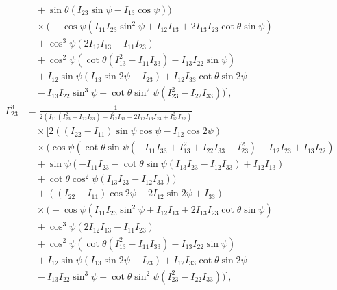 \documentclass[pdflatex,sn-mathphys-num]{sn-jnl}%
\theoremstyle{thmstyleone}%
\theoremstyle{thmstyletwo}%
\theoremstyle{thmstylethree}%
\begin{document}
\begin{appendices}
\begin{align}
    &\quad +\sin \theta (I_{23} \sin \psi-I_{13} \cos \psi)) \nonumber \\
    &\quad \times \bigg(-\cos \psi \left(I_{11} I_{23} \sin ^2\psi+I_{12} I_{13}+2 I_{13} I_{23} \cot \theta \sin \psi\right) \nonumber \\
    &\quad +\cos ^3\psi (2 I_{12} I_{13}-I_{11} I_{23}) \nonumber \\
    &\quad +\cos ^2\psi \left(\cot \theta \left(I_{13}^2-I_{11} I_{33}\right)-I_{13} I_{22} \sin \psi\right) \nonumber \\
    &\quad +I_{12} \sin \psi (I_{13} \sin 2\psi+I_{23}) +I_{12} I_{33} \cot \theta \sin 2\psi \nonumber \\
    &\quad -I_{13} I_{22} \sin ^3\psi+\cot \theta \sin ^2\psi \left(I_{23}^2-I_{22} I_{33}\right)\bigg) \bigg], \nonumber \\
    \Gamma^{3}_{23} &= \frac{1}{2 \left(I_{11} \left(I_{23}^2-I_{22} I_{33}\right)+I_{12}^2 I_{33}-2 I_{12} I_{13} I_{23}+I_{13}^2 I_{22}\right)} \nonumber \\
    &\quad \times \bigg[ 2 ((I_{22}-I_{11}) \sin \psi \cos \psi-I_{12} \cos 2\psi) \nonumber \\
    &\quad \times \bigg(\cos \psi \left(\cot \theta \sin \psi \left(-I_{11} I_{33}+I_{13}^2+I_{22} I_{33}-I_{23}^2\right)-I_{12} I_{23}+I_{13} I_{22}\right) \nonumber \\
    &\quad +\sin \psi (-I_{11} I_{23}-\cot \theta \sin \psi (I_{13} I_{23}-I_{12} I_{33})+I_{12} I_{13}) \nonumber \\
    &\quad +\cot \theta \cos ^2\psi (I_{13} I_{23}-I_{12} I_{33})\bigg) \nonumber \\
    &\quad +((I_{22}-I_{11}) \cos 2\psi+2 I_{12} \sin 2\psi+I_{33}) \nonumber \\
    &\quad \times \bigg(-\cos \psi \left(I_{11} I_{23} \sin ^2\psi+I_{12} I_{13}+2 I_{13} I_{23} \cot \theta \sin \psi\right) \nonumber \\
    &\quad +\cos ^3\psi (2 I_{12} I_{13}-I_{11} I_{23}) \nonumber \\
    &\quad +\cos ^2\psi \left(\cot \theta \left(I_{13}^2-I_{11} I_{33}\right)-I_{13} I_{22} \sin \psi\right) \nonumber \\
    &\quad +I_{12} \sin \psi (I_{13} \sin 2\psi+I_{23}) +I_{12} I_{33} \cot \theta \sin 2\psi \nonumber \\
    &\quad -I_{13} I_{22} \sin ^3\psi+\cot \theta \sin ^2\psi \left(I_{23}^2-I_{22} I_{33}\right)\bigg) \bigg], \nonumber \\

\end{align}
\end{appendices}
\end{document}
